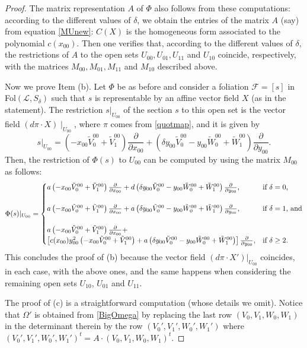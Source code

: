 \documentclass{amsart} %
\theoremstyle{definition}
\newcommand{\mcL}{\mathcal{L}}
\begin{document}
\begin{proof}
The matrix representation $ A $ of $ \Phi $ also follows from these computations:
according to the different values of $ \delta $, we obtain the entries of the matrix $ A $ (say)
from equation \eqref{MUnew}: $ C( X ) $ is the homogeneous form associated to the polynomial
$ c(x_{00}) $. Then one verifies that, according to the different values of
$ \delta $, the restrictions of $ A $ to the open sets $ U_{00}, U_{01}, U_{11} $ and $ U_{10} $
coincide, respectively, with the matrices $ M_{00}, M_{01}, M_{11} $ and $ M_{10} $ described above.

Now we prove Item (b). Let $\Phi$ be  as before and consider
a foliation $\mathcal F = [s] $ in Fol$(\mcL,S_{\delta})$
such that $ s $ is representable by an affine
vector field $X$ (as in the statement).
The restriction $ s\vert_{U_{00}} $ of the section $ s $ to this open set is the vector field $ (d\pi \cdot X)\mid_{U_{00}} $,
 where $ \pi $ comes from \eqref{quotmap}, and it is given by
\[
  s\vert_{U_{00}}=\left(-x_{00}\tilde{V}_0^{00}+\tilde{V}_1^{00}\right)\frac{\partial}{\partial x_{00}}+\left(\delta y_{00} \tilde{V}_0^{00}-y_{00}\tilde{W}_0^{00}+\tilde{W}_1^{00}\right)\frac{\partial}{\partial y_{00}}.
\]
Then, the restriction of $\Phi( s )$ to $U_{00}$  can be computed by using the matrix $M_{00}$ as follows:
\[
\Phi( s )\vert_{U_{00}}
 = \begin{cases}
  a\left(-x_{00}\tilde{V}_0^{00}+\tilde{V}_1^{00}\right)\frac{\partial}{\partial x_{00}}+ d\left(\delta y_{00} \tilde{V}_0^{00}-y_{00}\tilde{W}_0^{00}+\tilde{W}_1^{00}\right)\frac{\partial}{\partial y_{00}}
              , & \text{if $  \delta = 0 $,} \\ \\
  a\left(-x_{00}\tilde{V}_0^{00}+\tilde{V}_1^{00}\right)\frac{\partial}{\partial x_{00}}+
  a\left(\delta y_{00} \tilde{V}_0^{00}-y_{00}\tilde{W}_0^{00}+\tilde{W}_1^{00}\right)\frac{\partial}{\partial y_{00}},
                & \text{if $  \delta = 1 $,  and}\\ \\
        a\left(-x_{00}\tilde{V}_0^{00}+\tilde{V}_1^{00}\right)\frac{\partial}{\partial x_{00}}
        +\\\left[ c(x_{00})y_{00}^2\left(-x_{00}\tilde{V}_0^{00}+\tilde{V}_1^{00}\right)
        + a\left(\delta y_{00} \tilde{V}_0^{00}-y_{00}\tilde{W}_0^{00}+\tilde{W}_1^{00}\right)\right]\frac{\partial}{\partial y_{00}},
                & \text{if $  \delta \geq 2 $.}
    \end{cases}
\]
This concludes the proof of (b) because the vector field $ (d\pi \cdot X')\vert_{U_{00}} $ coincides, in each case, with the above ones, and the same happens when considering
the remaining open sets $U_{10}$, $U_{01}$ and $U_{11}$.

The proof of (c) is a straightforward computation (whose details we omit). Notice that $ \Omega' $ is obtained from
\eqref{BigOmega} by replacing the last row $ (V_0,V_1,W_0,W_1) $ in the determinant therein by the row $ (V_0',V_1',W_0',W_1') $
where $ (V_0',V_1',W_0',W_1')^t = A \cdot (V_0,V_1,W_0,W_1)^t $.
\end{proof}
\end{document}
